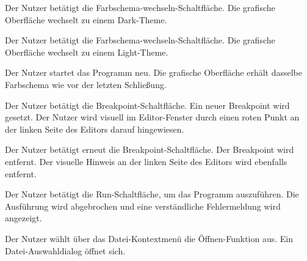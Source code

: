 \documentclass[parskip=full,11pt,twoside]{scrartcl}
\begin{document}

{Der Nutzer betätigt die Farbschema-wechseln-Schaltfläche.}
{Die grafische Oberfläche wechselt zu einem Dark-Theme.}

{Der Nutzer betätigt die Farbschema-wechseln-Schaltfläche.}
{Die grafische Oberfläche wechselt zu einem Light-Theme.}

{Der Nutzer startet das Programm neu.}
{Die grafische Oberfläche erhält dasselbe Farbschema wie vor der letzten Schließung.}



{Der Nutzer betätigt die Breakpoint-Schaltfläche.}
{Ein neuer Breakpoint wird gesetzt. Der Nutzer wird visuell im Editor-Fenster durch einen roten Punkt an der linken Seite des Editors darauf hingewiesen.}

{Der Nutzer betätigt erneut die Breakpoint-Schaltfläche.}
{Der Breakpoint wird entfernt. Der visuelle Hinweis an der linken Seite des Editors wird ebenfalls entfernt.}



{Der Nutzer betätigt die Run-Schaltfläche, um das Programm auszuführen.}
{Die Ausführung wird abgebrochen und eine verständliche Fehlermeldung wird angezeigt.}




{Der Nutzer wählt über das Datei-Kontextmenü die Öffnen-Funktion aus.}
{Ein Datei-Auswahldialog öffnet sich.}
\end{document}
